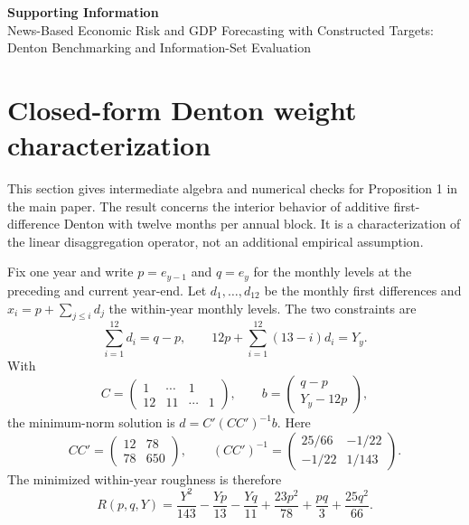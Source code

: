 \documentclass[12pt]{article}
\begin{document}
\begin{center}
{\Large \textbf{Supporting Information}}\\[0.5em]
{\large News-Based Economic Risk and GDP Forecasting with Constructed Targets: Denton Benchmarking and Information-Set Evaluation}
\end{center}

\section{Closed-form Denton weight characterization}
This section gives intermediate algebra and numerical checks for Proposition 1 in the main paper. The result concerns the interior behavior of additive first-difference Denton with twelve months per annual block. It is a characterization of the linear disaggregation operator, not an additional empirical assumption.

Fix one year and write $p=e_{y-1}$ and $q=e_y$ for the monthly levels at the preceding and current year-end. Let $d_1,\ldots,d_{12}$ be the monthly first differences and $x_i=p+\sum_{j\leq i}d_j$ the within-year monthly levels. The two constraints are
\[
\sum_{i=1}^{12}d_i=q-p,
\qquad
12p+\sum_{i=1}^{12}(13-i)d_i=Y_y.
\]
With
\[
C=\begin{pmatrix}
1&\cdots&1\\
12&11&\cdots&1
\end{pmatrix},
\qquad
b=\begin{pmatrix}q-p\\Y_y-12p\end{pmatrix},
\]
the minimum-norm solution is $d=C'(CC')^{-1}b$. Here
\[
CC'=\begin{pmatrix}12&78\\78&650\end{pmatrix},
\qquad
(CC')^{-1}=\begin{pmatrix}25/66&-1/22\\-1/22&1/143\end{pmatrix}.
\]
The minimized within-year roughness is therefore
\begin{equation}
R(p,q,Y)
=\frac{Y^2}{143}-\frac{Yp}{13}-\frac{Yq}{11}
 +\frac{23p^2}{78}+\frac{pq}{3}+\frac{25q^2}{66}.
\label{eq:s_R}
\end{equation}
\end{document}
